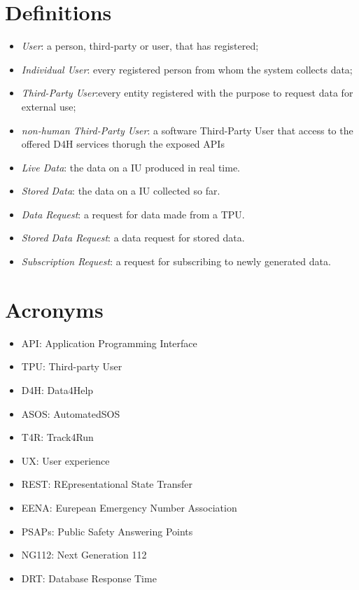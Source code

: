 \section{Definitions}
\begin{itemize}
\item \textit{User}: a person, third-party or user, that has registered;
\item \textit{Individual User}: every registered person from whom the system collects data; 
\item \textit{Third-Party User}:every entity registered with the purpose to request data for external use;
\item \textit{non-human Third-Party User}: a software Third-Party User that access to the offered D4H services thorugh the exposed APIs
\item \textit{Live Data}: the data on a IU produced in real time.
\item \textit{Stored Data}: the data on a IU collected so far.
\item \textit{Data Request}: a request for data made from a TPU.
\item \textit{Stored Data Request}: a data request for stored data.
\item \textit{Subscription Request}: a request for subscribing to newly generated data.
\end{itemize}
\section{Acronyms}
\begin{itemize}
\item API: Application Programming Interface
\item TPU: Third-party User
\item	D4H: Data4Help
\item	ASOS: AutomatedSOS
\item T4R: Track4Run
\item UX: User experience
\item REST: REpresentational State Transfer
\item EENA: Eurepean Emergency Number Association
\item PSAPs: Public Safety Answering Points
\item NG112: Next Generation 112
\item DRT: Database Response Time
\end{itemize}

